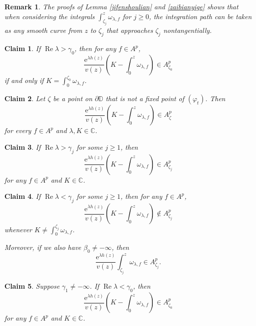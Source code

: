 \documentclass[10pt,a4paper]{amsart}
\newtheorem{remark}{Remark}
\newtheorem{claim}{Claim}
\begin{document}
\begin{remark}\label{zuihouremark}
The proofs of Lemma \ref{jifenshoulian} and \ref{zaibianyige} shows that when considering the integrals  $\int^z_{\zeta_j}\omega_{\lambda,f}$ for $j\geq0$, the integration path can be taken as any smooth curve from $z$ to $\zeta_j$ that approaches $\zeta_j$ nontangentially.
\end{remark}

\begin{claim}\label{>0}
If $ \operatorname{Re}\lambda>\gamma_0$, then for any $f\in A^p$,
$$\frac{ \mathrm{e}^{\lambda h(z)}}{v(z)}\left(K-\int_0^z\omega_{\lambda,f}\right)\in A^p_{\zeta_0}$$
if and only if $K=\int_0^{\zeta_0}\omega_{\lambda,f}$.
\end{claim}

\begin{claim}\label{others}
Let $\zeta$ be a point on $\partial \mathbb{D}$ that is not a fixed point of $(\varphi_t)$. Then
$$\frac{ \mathrm{e}^{\lambda h(z)}}{v(z)}\left(K-\int_0^{z}\omega_{\lambda,f}\right)\in A^p_{\zeta}$$
for every $f\in A^p$ and $\lambda, K\in\mathbb{C}$. 
\end{claim}

\begin{claim}\label{>j}
If $ \operatorname{Re}\lambda>\gamma_j$ for some $j\geq 1$, then
$$\frac{ \mathrm{e}^{\lambda h(z)}}{v(z)}\left(K-\int_0^{z}\omega_{\lambda,f}\right)\in A^p_{\zeta_j}$$
for any $f\in A^p$ and $K\in\mathbb{C}$. 
\end{claim}

\begin{claim}\label{<j}
If $ \operatorname{Re}\lambda<\gamma_j$ for some $j\geq 1$, then for any $f\in A^p$,
$$\frac{ \mathrm{e}^{\lambda h(z)}}{v(z)}\left(K-\int_0^z\omega_{\lambda,f}\right)\notin A^p_{\zeta_j}$$
whenever $K\ne\int_0^{\zeta_j}\omega_{\lambda,f}$.

Moreover, if we also have $\beta_0\ne-\infty$, then 
$$\frac{ \mathrm{e}^{\lambda h(z)}}{v(z)}\int^z_{\zeta_j}\omega_{\lambda,f}\in A^p_{\zeta_j}.$$

\end{claim}

\begin{claim}\label{<0}
Suppose $\gamma_1\ne-\infty$. If $ \operatorname{Re}\lambda<\gamma_0$, then 
$$\frac{ \mathrm{e}^{\lambda h(z)}}{v(z)}\left(K-\int_0^{z}\omega_{\lambda,f}\right)\in A^p_{\zeta_0}$$
for any $f\in A^p$ and $K\in\mathbb{C}$. 
\end{claim}
\end{document}
